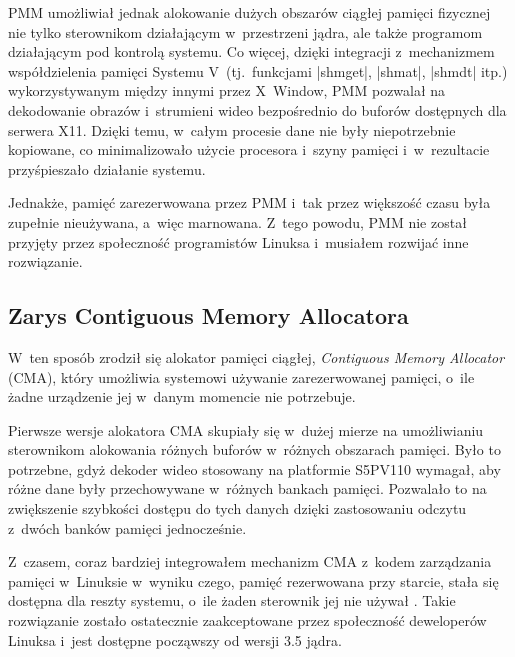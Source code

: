 PMM umożliwiał jednak alokowanie dużych obszarów ciągłej pamięci
fizycznej nie tylko sterownikom działającym w~przestrzeni jądra, ale
także programom działającym pod kontrolą systemu. Co więcej, dzięki
integracji z~mechanizmem współdzielenia pamięci Systemu
V~(tj.\ funkcjami \code|shmget|, \code|shmat|, \code|shmdt| itp.)
wykorzystywanym między innymi przez X~Window, PMM pozwalał na
dekodowanie obrazów i~strumieni wideo bezpośrednio do buforów
dostępnych dla serwera X11.  Dzięki temu, w~całym procesie dane nie
były niepotrzebnie kopiowane, co minimalizowało użycie procesora
i~szyny pamięci i~w~rezultacie przyśpieszało działanie systemu.

Jednakże, pamięć zarezerwowana przez PMM i~tak przez większość czasu
była zupełnie nieużywana, a~więc marnowana.  Z~tego powodu, PMM nie
został przyjęty przez społeczność programistów Linuksa i~musiałem
rozwijać inne rozwiązanie.

\subsection{Zarys Contiguous Memory Allocatora}

W~ten sposób zrodził się alokator pamięci ciągłej, \textit{Contiguous
  Memory Allocator} (CMA), który umożliwia systemowi używanie
zarezerwowanej pamięci, o~ile żadne urządzenie jej w~danym momencie
nie potrzebuje.

Pierwsze wersje alokatora CMA skupiały się w~dużej mierze na
umożliwianiu sterownikom alokowania różnych buforów w~różnych
obszarach pamięci.  Było to potrzebne, gdyż dekoder wideo stosowany na
platformie S5PV110 wymagał, aby różne dane były przechowywane
w~różnych bankach pamięci.  Pozwalało to na zwiększenie szybkości
dostępu do tych danych dzięki zastosowaniu odczytu z~dwóch banków
pamięci jednocześnie.

Z~czasem, coraz bardziej integrowałem mechanizm CMA z~kodem
zarządzania pamięci w~Linuksie w~wyniku czego, pamięć rezerwowana przy
starcie, stała się dostępna dla reszty systemu, o~ile żaden sterownik
jej nie używał \autocite{patch:cma-24}.  Takie rozwiązanie zostało
ostatecznie zaakceptowane przez społeczność deweloperów Linuksa i~jest
dostępne począwszy od wersji 3.5 jądra.
